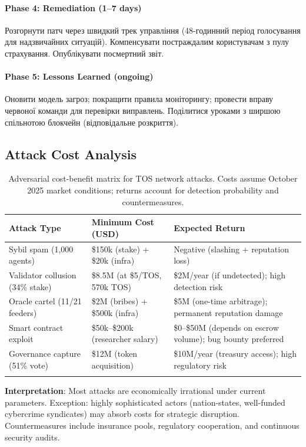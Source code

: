 \documentclass[11pt]{article}
\begin{document}
\paragraph{Phase 4: Remediation (1--7 days)}
Розгорнути патч через швидкий трек управління (48-годинний період голосування для надзвичайних ситуацій). Компенсувати постраждалим користувачам з пулу страхування. Опублікувати посмертний звіт.

\paragraph{Phase 5: Lessons Learned (ongoing)}
Оновити модель загроз; покращити правила моніторингу; провести вправу червоної команди для перевірки виправлень. Поділитися уроками з ширшою спільнотою блокчейн (відповідальне розкриття).

\subsection{Attack Cost Analysis}

\begin{longtable}{@{}p{}p{}p{}@{}}
\toprule
\textbf{Attack Type} & \textbf{Minimum Cost (USD)} & \textbf{Expected Return} \\\midrule
Sybil spam (1,000 agents) & \$150k (stake) + \$20k (infra) & Negative (slashing + reputation loss) \\
Validator collusion (34\% stake) & \$8.5M (at \$5/TOS, 570k TOS) & \$2M/year (if undetected); high detection risk \\
Oracle cartel (11/21 feeders) & \$2M (bribes) + \$500k (infra) & \$5M (one-time arbitrage); permanent reputation damage \\
Smart contract exploit & \$50k--\$200k (researcher salary) & \$0--\$50M (depends on escrow volume); bug bounty preferred \\
Governance capture (51\% vote) & \$12M (token acquisition) & \$10M/year (treasury access); high regulatory risk \\
\bottomrule
\caption{Adversarial cost-benefit matrix for TOS network attacks. Costs assume October 2025 market conditions; returns account for detection probability and countermeasures.}
\end{longtable}

\textbf{Interpretation}: Most attacks are economically irrational under current parameters. Exception: highly sophisticated actors (nation-states, well-funded cybercrime syndicates) may absorb costs for strategic disruption. Countermeasures include insurance pools, regulatory cooperation, and continuous security audits.
\end{document}
